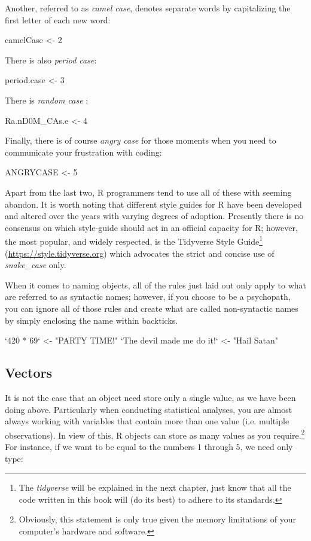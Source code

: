 \noindent
Another, referred to as \textit{camel case}, denotes separate words by capitalizing the first letter of each new word:

\begin{inR}
camelCase <- 2
\end{inR}
\medskip

\noindent
There is also \textit{period case}:
\begin{inR}
period.case <- 3
\end{inR}
\medskip

\noindent
There is \textit{random case} \parencite{Wickham2023}:
\begin{inR}
Ra.nD0M_CAs.e <- 4
\end{inR}
\medskip

\noindent
Finally, there is of course \textit{angry case} for those moments when you need to communicate your frustration with coding:
\begin{inR}
ANGRYCASE <- 5
\end{inR}
\medskip

Apart from the last two, R programmers tend to use all of these with seeming abandon. It is worth noting that different style guides for R have been developed and altered over the years with varying degrees of adoption. Presently there is no consensus on which style-guide should act in an official capacity for R; however, the most popular, and widely respected, is the Tidyverse Style Guide\footnote{The \textit{tidyverse} will be explained in the next chapter, just know that all the code written in this book will (do its best) to adhere to its standards.} (\url{https://style.tidyverse.org}) which advocates the strict and concise use of \textit{snake\_case} only.

When it comes to naming objects, all of the rules just laid out only apply to what are referred to as \glspl{syntactic name}; however, if you choose to be a psychopath, you can ignore all of those rules and create what are called \glspl{non-syntactic name} by simply enclosing the name within backticks.

\begin{inR}
`420 * 69` <- "PARTY TIME!"
`The devil made me do it!` <- "Hail Satan"
\end{inR}

\subsection{Vectors}

It is not the case that an object need store only a single value, as we have been doing above. Particularly when conducting statistical analyses, you are almost always working with variables that contain more than one value (i.e. multiple observations). In view of this, R objects can store as many values as you require.\footnote{Obviously, this statement is only true given the memory limitations of your computer's hardware and software.} For instance, if we want  to be equal to the numbers 1 through 5, we need only type: 

